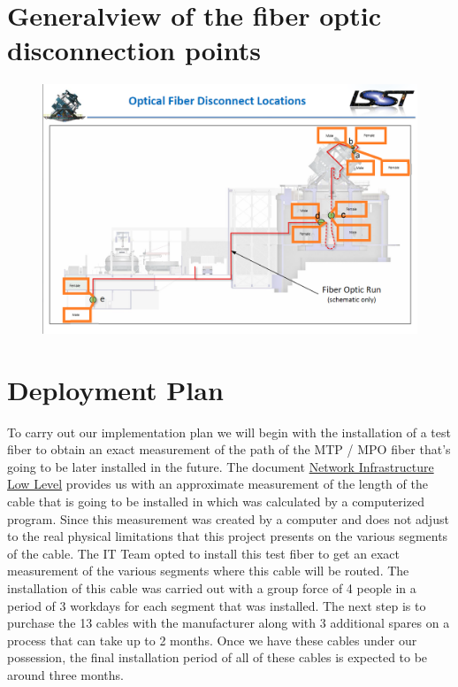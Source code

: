 \newpage

\section{Generalview of the fiber optic disconnection points}
\label{sec:disconnectpoints}
\vspace{30 mm}
\begin{figure}
  \centering
  \includegraphics[width=17cm]{images/33333.png}
\end{figure}

\newpage

\section{Deployment Plan}

To carry out our implementation plan we will begin with the installation of a test fiber to obtain an exact measurement of the path of the MTP / MPO fiber that's going to be later installed in the future. The document \href{https://confluence.lsstcorp.org/display/IT/Network+Infrastructure+Low-Level+Design+LLD?preview=/139036736/140285500/Telescope-Camera%20Optical%20Fibers%20layout%20v3.pdf}{Network Infrastructure Low Level} provides us with an approximate measurement of the length of the cable that is going to be installed in which was calculated by a computerized program. Since this measurement was created by a computer and does not adjust to the real physical limitations that this project presents on the various segments of the cable. The IT Team opted to install this test fiber to get an exact measurement of the various segments where this cable will be routed.
The installation of this cable was carried out with a group force of 4 people in a period of 3 workdays for each segment that was installed. The next step is to purchase the 13 cables with the manufacturer along with 3 additional spares on a process that can take up to 2 months. Once we have these cables under our possession, the final installation period of all of these cables is expected to be around three months.

